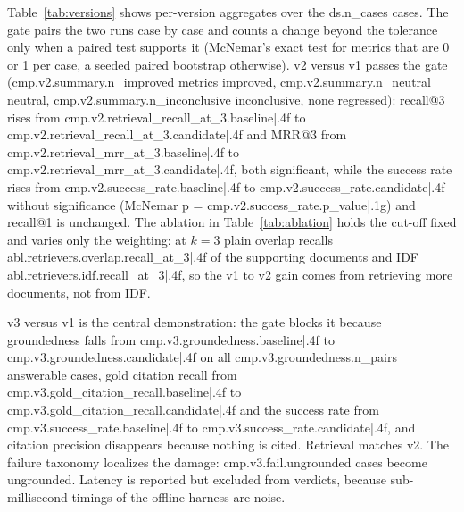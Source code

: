 Table~\ref{tab:versions} shows per-version aggregates over the {{ds.n_cases}} cases.
The gate pairs the two runs case by case and counts a change beyond the
tolerance only when a paired test supports it (McNemar's exact test for
metrics that are 0 or 1 per case, a seeded paired bootstrap otherwise).
v2 versus v1 passes the gate ({{cmp.v2.summary.n_improved}} metrics improved, {{cmp.v2.summary.n_neutral}} neutral, {{cmp.v2.summary.n_inconclusive}}
inconclusive, none regressed): recall@3 rises from {{cmp.v2.retrieval_recall_at_3.baseline|.4f}} to {{cmp.v2.retrieval_recall_at_3.candidate|.4f}} and
MRR@3 from {{cmp.v2.retrieval_mrr_at_3.baseline|.4f}} to {{cmp.v2.retrieval_mrr_at_3.candidate|.4f}}, both significant, while the success rate rises
from {{cmp.v2.success_rate.baseline|.4f}} to {{cmp.v2.success_rate.candidate|.4f}} without significance (McNemar p = {{cmp.v2.success_rate.p_value|.1g}}) and recall@1
is unchanged. The ablation in Table~\ref{tab:ablation} holds the cut-off
fixed and varies only the weighting: at $k=3$ plain overlap recalls {{abl.retrievers.overlap.recall_at_3|.4f}}
of the supporting documents and IDF {{abl.retrievers.idf.recall_at_3|.4f}}, so the v1 to v2 gain comes from
retrieving more documents, not from IDF.

v3 versus v1 is the central demonstration: the gate blocks it because
groundedness falls from {{cmp.v3.groundedness.baseline|.4f}} to {{cmp.v3.groundedness.candidate|.4f}} on all {{cmp.v3.groundedness.n_pairs}} answerable cases, gold
citation recall from {{cmp.v3.gold_citation_recall.baseline|.4f}} to {{cmp.v3.gold_citation_recall.candidate|.4f}} and the success rate from {{cmp.v3.success_rate.baseline|.4f}} to
{{cmp.v3.success_rate.candidate|.4f}}, and citation precision disappears because nothing is cited.
Retrieval matches v2. The failure taxonomy localizes the damage: {{cmp.v3.fail.ungrounded}} cases
become ungrounded. Latency is reported but excluded from verdicts, because
sub-millisecond timings of the offline harness are noise.
